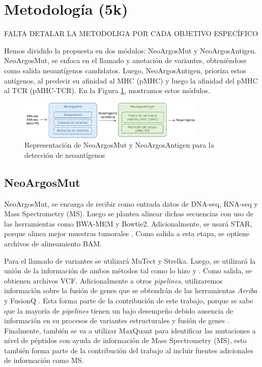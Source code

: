 \documentclass[a4paper,11pt]{article}
\begin{document}
\section{Metodología (5k)} 

FALTA DETALAR LA METODOLIGA POR CADA OBJETIVO ESPECÍFICO




Hemos dividido la propuesta en dos módulos: NeoArgosMut y NeoArgosAntigen. NeoArgosMut, se enfoca en el llamado y anotación de variantes, obteniéndose como salida neoantígenos candidatos. Luego, NeoArgosAntigen, prioriza estos antígenos, al predecir su afinidad al MHC (pMHC) y luego la afinidad del pMHC al TCR (pMHC-TCR). En la Figura \ref{fig:pipeline}, mostramos estos módulos. 



\begin{figure}[h]	
		\centering
		\includegraphics[width=0.8\textwidth]{../img/pipeline/proposal_pipeline}	
	\caption{Representación de NeoArgosMut y NeoArgosAntigen para la detección de neoantígenos}
	\label{fig:pipeline}
\end{figure}


\subsection{NeoArgosMut}



NeoArgosMut, se encarga de recibir como entrada datos de DNA-seq, RNA-seq y Mass Spectrometry (MS). Luego se plantea alinear dichas secuencias con uso de las herramientas como BWA-MEM y Bowtie2. Adicionalmente, se usará STAR, porque alinea mejor muestras tumorales \cite{rubinsteyn2018computational}. Como salida a esta etapa, se optiene archivos de alineamiento BAM.



Para el llamado de variantes se utilizará MuTect y Strelka. Luego, se utilizará la unión de la información de ambos métodos tal como lo hizo \cite{zhou2023prioritizing} y \cite{rubinsteyn2018computational}. Como salida, se obtienen archivos VCF. Adicionalmente a otros \textit{pipelines}, utilizaremos información sobre la fusión de genes que se obtendrán de las herramientas \textit{Arriba} \cite{uhrig2021accurate} y FusionQ \cite{liu2013fusionq}. Esta forma parte de la contribución de este trabajo, porque se sabe que la mayoría de \textit{pipelines} tienen un bajo desempeño debido ausencia de información en su procesos de variantes estructurales y fusión de genes \cite{wood2020neoepiscope}. Finalmente, también se va a utilizar MaxQuant para identificar las mutaciones a nivel de péptidos con ayuda de información de Mass Spectrometry (MS), esto también forma parte de la contribución del trabajo al incluir fuentes adicionales de información como MS.
\end{document}

